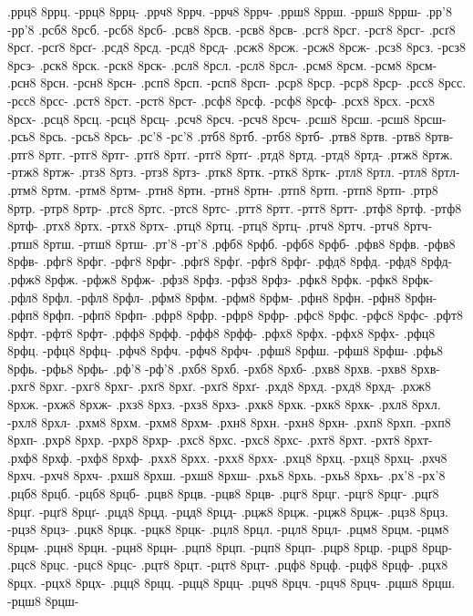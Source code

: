 {.ррц8 8ррц. -ррц8 8ррц-
.ррч8 8ррч. -ррч8 8ррч-
.ррш8 8ррш. -ррш8 8ррш-
.рр'8 -рр'8
.рсб8 8рсб. -рсб8 8рсб-
.рсв8 8рсв. -рсв8 8рсв-
.рсг8 8рсг. -рсг8 8рсг-
.рсґ8 8рсґ. -рсґ8 8рсґ-
.рсд8 8рсд. -рсд8 8рсд-
.рсж8 8рсж. -рсж8 8рсж-
.рсз8 8рсз. -рсз8 8рсз-
.рск8 8рск. -рск8 8рск-
.рсл8 8рсл. -рсл8 8рсл-
.рсм8 8рсм. -рсм8 8рсм-
.рсн8 8рсн. -рсн8 8рсн-
.рсп8 8рсп. -рсп8 8рсп-
.рср8 8рср. -рср8 8рср-
.рсс8 8рсс. -рсс8 8рсс-
.рст8 8рст. -рст8 8рст-
.рсф8 8рсф. -рсф8 8рсф-
.рсх8 8рсх. -рсх8 8рсх-
.рсц8 8рсц. -рсц8 8рсц-
.рсч8 8рсч. -рсч8 8рсч-
.рсш8 8рсш. -рсш8 8рсш-
.рсь8 8рсь. -рсь8 8рсь-
.рс'8 -рс'8
.ртб8 8ртб. -ртб8 8ртб-
.ртв8 8ртв. -ртв8 8ртв-
.ртг8 8ртг. -ртг8 8ртг-
.ртґ8 8ртґ. -ртґ8 8ртґ-
.ртд8 8ртд. -ртд8 8ртд-
.ртж8 8ртж. -ртж8 8ртж-
.ртз8 8ртз. -ртз8 8ртз-
.ртк8 8ртк. -ртк8 8ртк-
.ртл8 8ртл. -ртл8 8ртл-
.ртм8 8ртм. -ртм8 8ртм-
.ртн8 8ртн. -ртн8 8ртн-
.ртп8 8ртп. -ртп8 8ртп-
.ртр8 8ртр. -ртр8 8ртр-
.ртс8 8ртс. -ртс8 8ртс-
.ртт8 8ртт. -ртт8 8ртт-
.ртф8 8ртф. -ртф8 8ртф-
.ртх8 8ртх. -ртх8 8ртх-
.ртц8 8ртц. -ртц8 8ртц-
.ртч8 8ртч. -ртч8 8ртч-
.ртш8 8ртш. -ртш8 8ртш-
.рт'8 -рт'8
.рфб8 8рфб. -рфб8 8рфб-
.рфв8 8рфв. -рфв8 8рфв-
.рфг8 8рфг. -рфг8 8рфг-
.рфґ8 8рфґ. -рфґ8 8рфґ-
.рфд8 8рфд. -рфд8 8рфд-
.рфж8 8рфж. -рфж8 8рфж-
.рфз8 8рфз. -рфз8 8рфз-
.рфк8 8рфк. -рфк8 8рфк-
.рфл8 8рфл. -рфл8 8рфл-
.рфм8 8рфм. -рфм8 8рфм-
.рфн8 8рфн. -рфн8 8рфн-
.рфп8 8рфп. -рфп8 8рфп-
.рфр8 8рфр. -рфр8 8рфр-
.рфс8 8рфс. -рфс8 8рфс-
.рфт8 8рфт. -рфт8 8рфт-
.рфф8 8рфф. -рфф8 8рфф-
.рфх8 8рфх. -рфх8 8рфх-
.рфц8 8рфц. -рфц8 8рфц-
.рфч8 8рфч. -рфч8 8рфч-
.рфш8 8рфш. -рфш8 8рфш-
.рфь8 8рфь. -рфь8 8рфь-
.рф'8 -рф'8
.рхб8 8рхб. -рхб8 8рхб-
.рхв8 8рхв. -рхв8 8рхв-
.рхг8 8рхг. -рхг8 8рхг-
.рхґ8 8рхґ. -рхґ8 8рхґ-
.рхд8 8рхд. -рхд8 8рхд-
.рхж8 8рхж. -рхж8 8рхж-
.рхз8 8рхз. -рхз8 8рхз-
.рхк8 8рхк. -рхк8 8рхк-
.рхл8 8рхл. -рхл8 8рхл-
.рхм8 8рхм. -рхм8 8рхм-
.рхн8 8рхн. -рхн8 8рхн-
.рхп8 8рхп. -рхп8 8рхп-
.рхр8 8рхр. -рхр8 8рхр-
.рхс8 8рхс. -рхс8 8рхс-
.рхт8 8рхт. -рхт8 8рхт-
.рхф8 8рхф. -рхф8 8рхф-
.рхх8 8рхх. -рхх8 8рхх-
.рхц8 8рхц. -рхц8 8рхц-
.рхч8 8рхч. -рхч8 8рхч-
.рхш8 8рхш. -рхш8 8рхш-
.рхь8 8рхь. -рхь8 8рхь-
.рх'8 -рх'8
.рцб8 8рцб. -рцб8 8рцб-
.рцв8 8рцв. -рцв8 8рцв-
.рцг8 8рцг. -рцг8 8рцг-
.рцґ8 8рцґ. -рцґ8 8рцґ-
.рцд8 8рцд. -рцд8 8рцд-
.рцж8 8рцж. -рцж8 8рцж-
.рцз8 8рцз. -рцз8 8рцз-
.рцк8 8рцк. -рцк8 8рцк-
.рцл8 8рцл. -рцл8 8рцл-
.рцм8 8рцм. -рцм8 8рцм-
.рцн8 8рцн. -рцн8 8рцн-
.рцп8 8рцп. -рцп8 8рцп-
.рцр8 8рцр. -рцр8 8рцр-
.рцс8 8рцс. -рцс8 8рцс-
.рцт8 8рцт. -рцт8 8рцт-
.рцф8 8рцф. -рцф8 8рцф-
.рцх8 8рцх. -рцх8 8рцх-
.рцц8 8рцц. -рцц8 8рцц-
.рцч8 8рцч. -рцч8 8рцч-
.рцш8 8рцш. -рцш8 8рцш-
}
